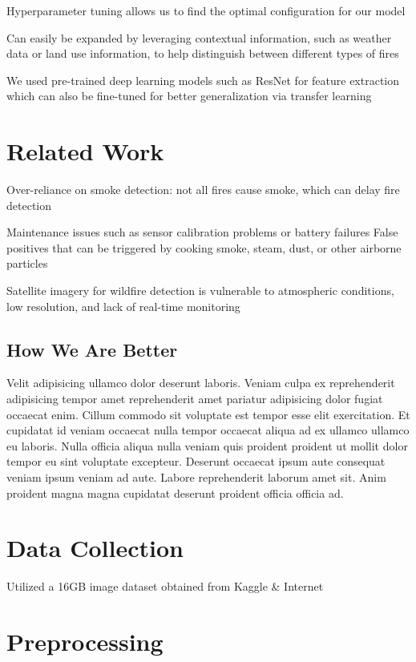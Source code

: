 Hyperparameter tuning allows us to find the optimal configuration for our model

Can easily be expanded by leveraging contextual information, such as weather data or land use information, to help distinguish between different types of fires

We used pre-trained deep learning models such as ResNet for feature extraction which can also be fine-tuned for better generalization via transfer learning

\section{Related Work}

Over-reliance on smoke detection: not all fires cause smoke, which can delay fire detection

Maintenance issues such as sensor calibration problems or battery failures
False positives that can be triggered by cooking smoke, steam, dust, or other airborne particles

Satellite imagery for wildfire detection is vulnerable to atmospheric conditions, low resolution, and lack of real-time monitoring

\subsection{How We Are Better}

Velit adipisicing ullamco dolor deserunt laboris. Veniam culpa ex reprehenderit adipisicing tempor amet reprehenderit amet pariatur adipisicing dolor fugiat occaecat enim. Cillum commodo sit voluptate est tempor esse elit exercitation. Et cupidatat id veniam occaecat nulla tempor occaecat aliqua ad ex ullamco ullamco eu laboris. Nulla officia aliqua nulla veniam quis proident proident ut mollit dolor tempor eu sint voluptate excepteur. Deserunt occaecat ipsum aute consequat veniam ipsum veniam ad aute. Labore reprehenderit laborum amet sit. Anim proident magna magna cupidatat deserunt proident officia officia ad.

\section{Data Collection}

Utilized a 16GB image dataset obtained from Kaggle \& Internet

\section{Preprocessing}

